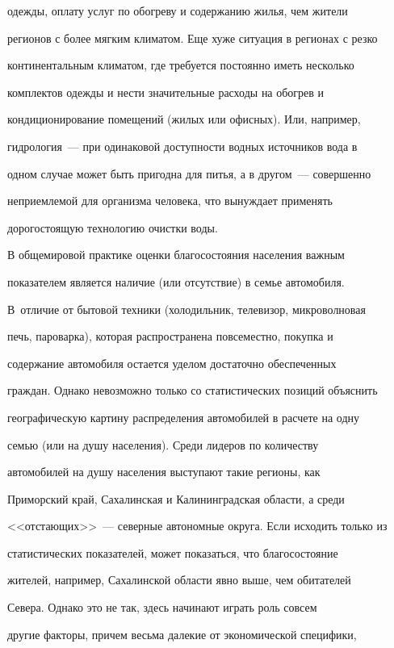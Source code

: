 одежды, оплату услуг по обогреву и содержанию жилья, чем жители


регионов с более мягким климатом. Еще хуже ситуация в регионах с резко


континентальным климатом, где требуется постоянно иметь несколько


комплектов одежды и нести значительные расходы на обогрев и


кондиционирование помещений (жилых или офисных). Или, например,


гидрология~--- при одинаковой доступности водных источников вода в


одном случае может быть пригодна для питья, а в другом~--- совершенно


неприемлемой для организма человека, что вынуждает применять


дорогостоящую технологию очистки воды.





    В общемировой практике оценки благосостояния населения важным


показателем является наличие (или отсутствие) в семье автомобиля.


В~отличие от бытовой техники (холодильник, телевизор, микроволновая


печь, пароварка), которая распространена повсеместно, покупка и


содержание автомобиля остается уделом достаточно обеспеченных


граждан. Однако невозможно только со статистических позиций объяснить


географическую картину распределения автомобилей в расчете на одну


семью (или на душу населения). Среди лидеров по количеству


автомобилей на душу населения выступают такие регионы, как


Приморский край, Сахалинская и Калининградская области, а среди


<<от\-ста\-ющих>>~--- северные автономные округа. Если исходить только из


статистических показателей, может показаться, что благосостояние


жителей, например, Сахалинской области явно выше, чем обитателей


Севера. Однако это не так, здесь начинают играть роль совсем


другие факторы, причем весьма далекие от экономической специфики,



